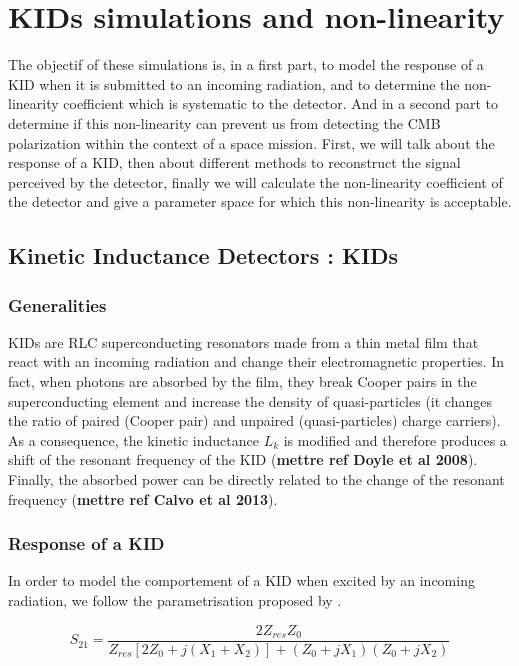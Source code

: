\documentclass[english,11pt]{report}
\begin{document}
\chapter{KIDs simulations and non-linearity}

The objectif of these simulations is, in a first part, to model the response of a KID when it is submitted to an incoming radiation, and to determine the non-linearity coefficient which is systematic to the detector. And in a second part to determine if this non-linearity can prevent us from detecting the CMB polarization within the context of a space mission. First, we will talk about the response of a KID, then about different methods to reconstruct the signal perceived by the detector, finally we will calculate the non-linearity coefficient of the detector and give a parameter space for which this non-linearity is acceptable.

\section{Kinetic Inductance Detectors : KIDs}
\subsection{Generalities}
KIDs are RLC superconducting resonators made from a thin metal film that react with an incoming radiation and change their electromagnetic properties. In fact, when photons are absorbed by the film, they break Cooper pairs in the superconducting element and increase the density of quasi-particles (it changes the ratio of paired (Cooper pair) and unpaired (quasi-particles) charge carriers). As a consequence, the kinetic inductance $L_{k}$ is modified and therefore produces a shift of the resonant frequency of the KID (\textbf{mettre ref Doyle et al 2008}). Finally, the absorbed power can be directly related to the change of  the resonant frequency (\textbf{mettre ref Calvo et al 2013}).

	\subsection{Response of a KID}
In order to model the comportement of a KID when excited by an incoming radiation, we follow the parametrisation proposed by \cite{2008ApPhL..93m4102G}.

\begin{equation}
S_{21} = \frac{2Z_{res}Z_{0}}{Z_{res}[2Z_{0} + j(X_{1}+X_{2})] + (Z_{0} +jX_{1})(Z_{0} +jX_{2})}
\end{equation}
\end{document}
